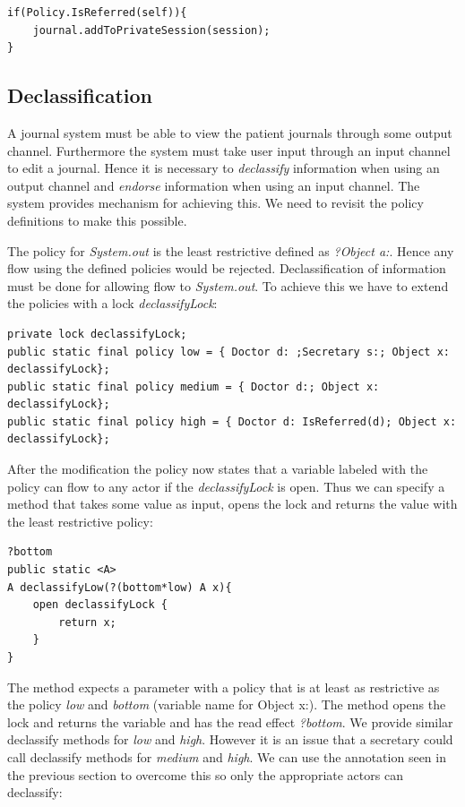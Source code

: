 \begin{lstlisting}
if(Policy.IsReferred(self)){
	journal.addToPrivateSession(session);
}
\end{lstlisting}



\subsection{Declassification}
A journal system must be able to view the patient journals through some output channel. Furthermore the system must take user input through an input channel to edit a journal. Hence it is necessary to \emph{declassify} information when using an output channel and \emph{endorse} information when using an input channel. The system provides mechanism for achieving this. We need to revisit the policy definitions to make this possible. 

The policy for \emph{System.out} is the least restrictive defined as \emph{?{Object a:}}.
Hence any flow using the defined policies would be rejected. Declassification of information must be done for allowing flow to \emph{System.out}. To achieve this we have to extend the policies with a lock \emph{declassifyLock}:

\begin{lstlisting}
private lock declassifyLock;
public static final policy low = { Doctor d: ;Secretary s:; Object x: declassifyLock};
public static final policy medium = { Doctor d:; Object x: declassifyLock};
public static final policy high = { Doctor d: IsReferred(d); Object x: declassifyLock};
\end{lstlisting}

After the modification the policy now states that a variable labeled with the policy can flow to any actor if the \emph{declassifyLock} is open. Thus we can specify a method that takes some value as input, opens the lock and returns the value with the least restrictive policy:

\begin{lstlisting}
?bottom
public static <A> 
A declassifyLow(?(bottom*low) A x){
	open declassifyLock {
		return x;
	}
}
\end{lstlisting}

The method expects a parameter with a policy that is at least as restrictive as the policy \emph{low} and \emph{bottom} (variable name for {Object x:}). The method opens the lock and returns the variable and has the read effect \emph{?bottom}.  We provide similar declassify methods for \emph{low} and \emph{high}. However it is an issue that a secretary could call declassify methods for \emph{medium} and \emph{high}. We can use the annotation seen in the previous section to overcome this so only the appropriate actors can declassify:

